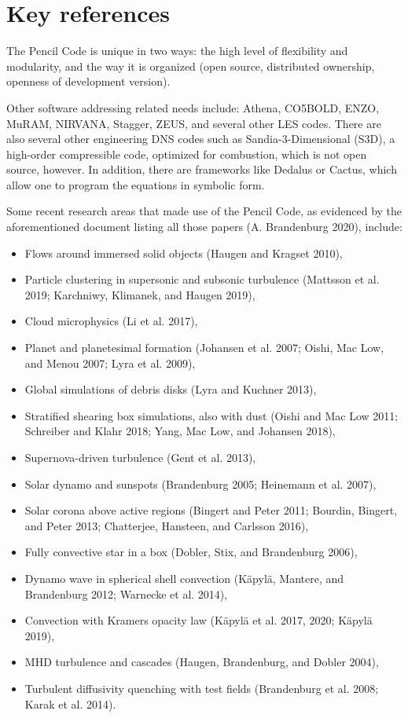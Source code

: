 \documentclass[10pt,a4paper,onecolumn]{article}
\providecommand{\tightlist}{%
  \setlength{\itemsep}{0pt}\setlength{\parskip}{0pt}}
\begin{document}
\hypertarget{key-references}{%
\section{Key references}\label{key-references}}

The Pencil Code is unique in two ways: the high level of flexibility and
modularity, and the way it is organized (open source, distributed
ownership, openness of development version).

Other software addressing related needs include: Athena, CO5BOLD, ENZO,
MuRAM, NIRVANA, Stagger, ZEUS, and several other LES codes. There are
also several other engineering DNS codes such as Sandia-3-Dimensional
(S3D), a high-order compressible code, optimized for combustion, which
is not open source, however. In addition, there are frameworks like
Dedalus or Cactus, which allow one to program the equations in symbolic
form.

Some recent research areas that made use of the Pencil Code, as
evidenced by the aforementioned document listing all those papers (A.
Brandenburg 2020), include:

\begin{itemize}
\tightlist
\item
  Flows around immersed solid objects (Haugen and Kragset 2010),
\item
  Particle clustering in supersonic and subsonic turbulence (Mattsson et
  al. 2019; Karchniwy, Klimanek, and Haugen 2019),
\item
  Cloud microphysics (Li et al. 2017),
\item
  Planet and planetesimal formation (Johansen et al. 2007; Oishi, Mac
  Low, and Menou 2007; Lyra et al. 2009),
\item
  Global simulations of debris disks (Lyra and Kuchner 2013),
\item
  Stratified shearing box simulations, also with dust (Oishi and Mac Low
  2011; Schreiber and Klahr 2018; Yang, Mac Low, and Johansen 2018),
\item
  Supernova-driven turbulence (Gent et al. 2013),
\item
  Solar dynamo and sunspots (Brandenburg 2005; Heinemann et al. 2007),
\item
  Solar corona above active regions (Bingert and Peter 2011; Bourdin,
  Bingert, and Peter 2013; Chatterjee, Hansteen, and Carlsson 2016),
\item
  Fully convective star in a box (Dobler, Stix, and Brandenburg 2006),
\item
  Dynamo wave in spherical shell convection (Käpylä, Mantere, and
  Brandenburg 2012; Warnecke et al. 2014),
\item
  Convection with Kramers opacity law (Käpylä et al. 2017, 2020; Käpylä
  2019),
\item
  MHD turbulence and cascades (Haugen, Brandenburg, and Dobler 2004),
\item
  Turbulent diffusivity quenching with test fields (Brandenburg et al.
  2008; Karak et al. 2014).
\end{itemize}
\end{document}
